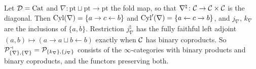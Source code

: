 \begin{exmp}
\label{ex:adjoin-products}
%
Let $\mathcal{D} = \mathrm{Cat}$ and
$\nabla\colon \mathrm{pt} \sqcup \mathrm{pt} \to \mathrm{pt}$
the fold map, so that
$\nabla^{\natural}\colon \mathcal{C} \to \mathcal{C} \times \mathcal{C}$
is the diagonal. Then
$\mathrm{Cyl}(\nabla) = \{a \to c \leftarrow b\}$
and
$\mathrm{Cyl}'(\nabla) = \{a \leftarrow c \to b\}$,
and $j_{\nabla}$, $k_{\nabla}$ are the inclusions of $\{a,b\}$. Restriction
$j_{\nabla}^{\natural}$
has the fully faithful left adjoint
$(a,b) \mapsto (a \to a \sqcup b \leftarrow b)$
exactly when $\mathcal{C}$ has binary coproducts.
So
$\mathcal{P}^{\dashv}_{\{\nabla\},\{\nabla\}} = \mathcal{P}_{\{k_{\nabla}\},\{j_{\nabla}\}}$
consists of the $\infty$-categories with binary products and binary coproducts,
and the functors preserving both.
\end{exmp}

